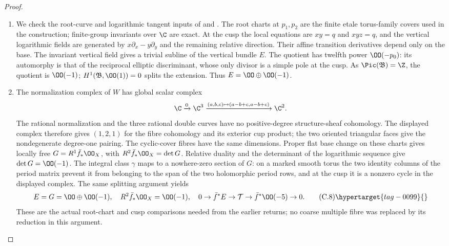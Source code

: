 \begin{proof}

\begin{enumerate}[label={$\langle1\rangle$\arabic*.},leftmargin=*]
\item We check the root-curve and logarithmic tangent inputs of  and . The root charts at $p_1,p_2$ are the finite etale torus-family covers used in the construction; finite-group invariants over $\C$ are exact. At the cusp the local equations are $xy=q$ and $xyz=q$, and the vertical logarithmic fields are generated by $x\partial_x-y\partial_y$ and the remaining relative direction. Their affine transition derivatives depend only on the base. The invariant vertical field gives a trivial subline of the vertical bundle $E$. The quotient has twelfth power $\OO(-p_0)$: its automorphy is that of the reciprocal elliptic discriminant, whose only divisor is a simple pole at the cusp. As $\Pic(\mathfrak B)=\Z$, the quotient is $\OO(-1)$; $H^1(\mathfrak B,\OO(1))=0$ splits the extension. Thus $E=\OO\oplus\OO(-1)$.

\item The normalization complex of $W$ has global scalar complex
\[
 \C\xrightarrow{0}\C^3
 \xrightarrow{(a,b,c)\mapsto(a-b+c,a-b+c)}\C^2.
\]
The rational normalization and the three rational double curves have no positive-degree structure-sheaf cohomology. The displayed complex therefore gives $(1,2,1)$ for the fibre cohomology and its exterior cup product; the two oriented triangular faces give the nondegenerate degree-one pairing. The cyclic-cover fibres have the same dimensions. Proper flat base change on these charts gives locally free $G=R^1\bar f_*\OO_X$, with $R^2\bar f_*\OO_X=\det G$. Relative duality and the determinant of the logarithmic sequence give $\det G=\OO(-1)$. The integral class $\gamma$ maps to a nowhere-zero section of $G$: on a marked smooth torus the two identity columns of the period matrix prevent it from belonging to the span of the two holomorphic period rows, and at the cusp it is a nonzero cycle in the displayed complex. The same splitting argument yields
\[
E=G=\OO\oplus\OO(-1),\quad R^2\bar f_*\OO_X=\OO(-1),
\quad0\to\bar f^*E\to\mathcal T\to\bar f^*\OO(-5)\to0. \tag{C.8}\hypertarget{tag-0099}{}\label{cdp:eq:C.8}
\]
These are the actual root-chart and cusp comparisons needed from the earlier returns; no coarse multiple fibre was replaced by its reduction in this argument.


\end{enumerate}
\end{proof}
